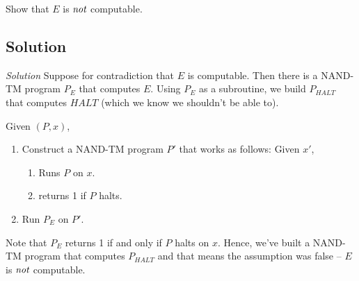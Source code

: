 \documentclass[11pt]{article}
\theoremstyle{definition}
\theoremstyle{remark}
\begin{document}
    Show that $E$ is $\emph{not}$ computable.
    
\subsection{Solution}
    
\emph{Solution} Suppose for contradiction that $E$ is computable. Then there is a NAND-TM program $P_E$ that computes $E$. Using
    $P_E$ as a subroutine, we build $P_{HALT}$ that computes $HALT$ (which we know we shouldn't be able to).

    Given $(P, x)$,
    \begin{enumerate}
        \item{
            Construct a NAND-TM program $P'$ that works as follows: Given $x'$,
            \begin{enumerate}
                \item{
                    Runs $P$ on $x$.
                }
            \item{
                    returns 1 if $P$ halts.
                }
            \end{enumerate}
            }
        \item{
            Run $P_E$ on $P'$. 
            }
    \end{enumerate}

    Note that $P_E$ returns 1 if and only if $P$ halts on $x$. Hence, we've built a NAND-TM program that computes $P_{HALT}$ and that means
    the assumption was false -- $E$ is $\emph{not}$ computable.
\end{document}
